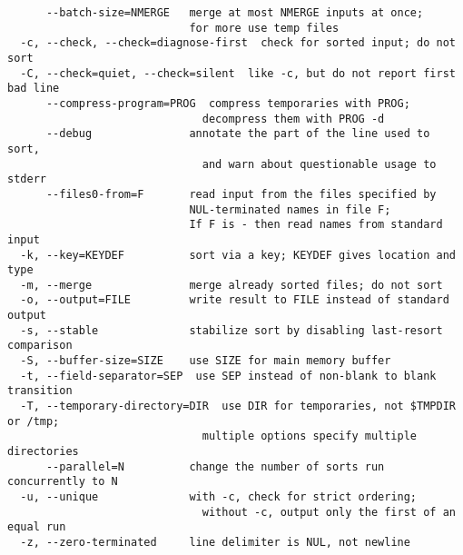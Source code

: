 \documentclass[11pt,a4paper]{article}
\begin{document}
\begin{verbatim}
      --batch-size=NMERGE   merge at most NMERGE inputs at once;
                            for more use temp files
  -c, --check, --check=diagnose-first  check for sorted input; do not sort
  -C, --check=quiet, --check=silent  like -c, but do not report first bad line
      --compress-program=PROG  compress temporaries with PROG;
                              decompress them with PROG -d
      --debug               annotate the part of the line used to sort,
                              and warn about questionable usage to stderr
      --files0-from=F       read input from the files specified by
                            NUL-terminated names in file F;
                            If F is - then read names from standard input
  -k, --key=KEYDEF          sort via a key; KEYDEF gives location and type
  -m, --merge               merge already sorted files; do not sort
  -o, --output=FILE         write result to FILE instead of standard output
  -s, --stable              stabilize sort by disabling last-resort comparison
  -S, --buffer-size=SIZE    use SIZE for main memory buffer
  -t, --field-separator=SEP  use SEP instead of non-blank to blank transition
  -T, --temporary-directory=DIR  use DIR for temporaries, not $TMPDIR or /tmp;
                              multiple options specify multiple directories
      --parallel=N          change the number of sorts run concurrently to N
  -u, --unique              with -c, check for strict ordering;
                              without -c, output only the first of an equal run
  -z, --zero-terminated     line delimiter is NUL, not newline
\end{verbatim}
\end{document}
